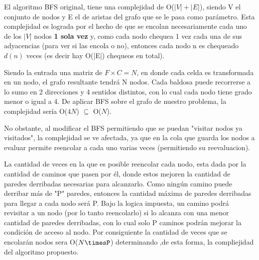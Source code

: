  El algoritmo BFS original, tiene una complejidad de O($|V|+|E|$), siendo V el conjunto de nodos y E el de aristas del grafo que se le pasa como parámetro. Esta complejidad es lograda por el hecho de que se encolan necesariamente cada uno de los $|V|$ nodos {\bf 1 sola vez} y, como cada nodo chequea 1 vez cada una de sus adyacencias (para ver si las encola o no), entonces cada nodo n es chequeado $d(n)$ veces (es decir hay O(|E|) chequeos en total). 

Siendo la entrada una matriz de $F \times C = N$, en donde cada celda es transformada en un nodo, el grafo resultante tendrá N nodos. Cada baldosa puede recorrerse a lo sumo en 2 direcciones y 4 sentidos distintos, con lo cual cada nodo tiene grado menor o igual a 4. De aplicar BFS sobre el grafo de nuestro problema, la complejidad sería O($4N$) $\subseteq$ O($N$).

No obstante, al modificar el BFS permitiendo que se puedan "visitar nodos ya visitados", la complejidad se ve afectada, ya que en la cola que guarda los nodos a evaluar permite reencolar a cada uno varias veces (permitiendo su reevaluacion).

La cantidad de veces en la que es posible reencolar cada nodo, esta dada por la cantidad de caminos que pasen por él, donde estos mejoren la cantidad de paredes derribadas necesarias para alcanzarlo. Como ningún camino puede derribar más de "P" paredes, entonces la cantidad máxima de paredes derribadas para llegar a cada nodo será P. Bajo la logica impuesta, un camino podrá revisitar a un nodo (por lo tanto reencolarlo) si lo alcanza con una menor cantidad de paredes derribadas, con lo cual solo P caminos podrán mejorar la condición de acceso al nodo. Por consiguiente la cantidad de veces que se encolarán nodos sera O($N\timesP$) determinando ,de esta forma, la compliejidad del algoritmo propuesto.






